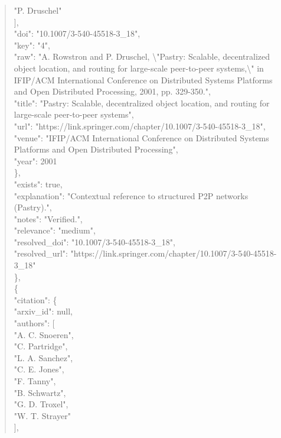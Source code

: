 \documentclass[11pt]{article}
\begin{document}
\begin{quote}
          "P. Druschel"\\
        ],\\
        "doi": "10.1007/3-540-45518-3\_18",\\
        "key": "4",\\
        "raw": "A. Rowstron and P. Druschel, \textbackslash{}"Pastry: Scalable, decentralized object location, and routing for large-scale peer-to-peer systems,\textbackslash{}" in IFIP/ACM International Conference on Distributed Systems Platforms and Open Distributed Processing, 2001, pp. 329-350.",\\
        "title": "Pastry: Scalable, decentralized object location, and routing for large-scale peer-to-peer systems",\\
        "url": "https://link.springer.com/chapter/10.1007/3-540-45518-3\_18",\\
        "venue": "IFIP/ACM International Conference on Distributed Systems Platforms and Open Distributed Processing",\\
        "year": 2001\\
      \},\\
      "exists": true,\\
      "explanation": "Contextual reference to structured P2P networks (Pastry).",\\
      "notes": "Verified.",\\
      "relevance": "medium",\\
      "resolved\_doi": "10.1007/3-540-45518-3\_18",\\
      "resolved\_url": "https://link.springer.com/chapter/10.1007/3-540-45518-3\_18"\\
    \},\\
    \{\\
      "citation": \{\\
        "arxiv\_id": null,\\
        "authors": [\\
          "A. C. Snoeren",\\
          "C. Partridge",\\
          "L. A. Sanchez",\\
          "C. E. Jones",\\
          "F. Tanny",\\
          "B. Schwartz",\\
          "G. D. Troxel",\\
          "W. T. Strayer"\\
        ],\\

\end{quote}
\end{document}
